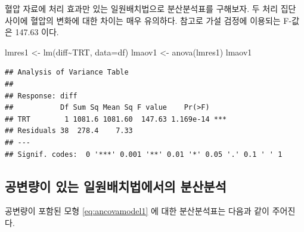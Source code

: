\documentclass[
]{book}
\newenvironment{Shaded}{\begin{snugshade}}{\end{snugshade}}
\newcommand{\AttributeTok}[1]{\textcolor[rgb]{0.77,0.63,0.00}{#1}}
\newcommand{\FunctionTok}[1]{\textcolor[rgb]{0.00,0.00,0.00}{#1}}
\newcommand{\NormalTok}[1]{#1}
\newcommand{\OtherTok}[1]{\textcolor[rgb]{0.56,0.35,0.01}{#1}}
\newcommand{\SpecialCharTok}[1]{\textcolor[rgb]{0.00,0.00,0.00}{#1}}
\begin{document}
혈압 자료에 처리 효과만 있는 일원배치법으로 분산분석표를 구해보자. 두 처리 집단 사이에 혈압의 변화에 대한 차이는 매우 유의하다. 참고로 가설 검정에 이용되는 F-값은 147.63 이다.

\begin{Shaded}
\begin{Highlighting}[]
\NormalTok{lmres1 }\OtherTok{\textless{}{-}} \FunctionTok{lm}\NormalTok{(diff}\SpecialCharTok{\textasciitilde{}}\NormalTok{TRT, }\AttributeTok{data=}\NormalTok{df)}
\NormalTok{lmaov1 }\OtherTok{\textless{}{-}} \FunctionTok{anova}\NormalTok{(lmres1)}
\NormalTok{lmaov1}
\end{Highlighting}
\end{Shaded}

\begin{verbatim}
## Analysis of Variance Table
## 
## Response: diff
##           Df Sum Sq Mean Sq F value    Pr(>F)    
## TRT        1 1081.6 1081.60  147.63 1.169e-14 ***
## Residuals 38  278.4    7.33                      
## ---
## Signif. codes:  0 '***' 0.001 '**' 0.01 '*' 0.05 '.' 0.1 ' ' 1
\end{verbatim}

\hypertarget{uxacf5uxbcc0uxb7c9uxc774-uxc788uxb294-uxc77cuxc6d0uxbc30uxce58uxbc95uxc5d0uxc11cuxc758-uxbd84uxc0b0uxbd84uxc11d}{%
\subsection{공변량이 있는 일원배치법에서의 분산분석}\label{uxacf5uxbcc0uxb7c9uxc774-uxc788uxb294-uxc77cuxc6d0uxbc30uxce58uxbc95uxc5d0uxc11cuxc758-uxbd84uxc0b0uxbd84uxc11d}}

공변량이 포함된 모형 \eqref{eq:ancovamodel1} 에 대한 분산분석표는 다음과 같이 주어진다.
\end{document}
